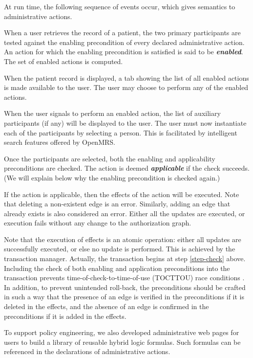 \documentclass{acm_proc_article-sp}
\newcommand{\Dfn}[1]{\textbf{\emph{#1}}}
\begin{document}
At run time, the following sequence of events occur,
which gives semantics to administrative actions.
\begin{compactenum}
\item When a user retrieves the record of a patient, the two primary
  participants are tested against the enabling precondition of every
  declared administrative action.  An action for which the enabling
  precondition is satisfied is said to be \Dfn{enabled}.
  The set of enabled actions is computed.
\item When the patient record is displayed, a tab showing
  the list of all enabled actions is made available to the user.
  The user may choose to perform any of the enabled actions.
\item When the user signals to perform an enabled action, the list of
  auxiliary participants (if any) will be displayed to the user.  The
  user must now instantiate each of the participants by selecting a person.
  This is facilitated by intelligent search features offered by
  OpenMRS.
\item \label{step-check} Once the participants are selected, both the
  enabling and applicability preconditions are checked.  The action is
  deemed \Dfn{applicable} if the check succeeds.  (We will explain
  below why the enabling precondition is checked again.)
\item If the action is applicable, then the effects of the action will
  be executed.  Note that deleting a non-existent edge is an error.
  Similarly, adding an edge that already exists is also considered an
  error.  Either all the updates are executed, or execution fails
  without any change to the authorization graph.
\end{compactenum}
Note that the execution of effects is an atomic operation: either all
updates are successfully executed, or else no update is performed.
This is achieved by the transaction manager.  Actually, the
transaction begins at step \ref{step-check} above.  Including the
check of both enabling and application preconditions into the
transaction prevents time-of-check-to-time-of-use (TOCTTOU) race
conditions \cite[\S 6.2.1]{Anderson}.  In addition, to prevent
unintended roll-back, the preconditions should be crafted in such a
way that the presence of an edge is verified in the preconditions if
it is deleted in the effects, and the absence of an edge is confirmed
in the preconditions if it is added in the effects.

To support policy engineering, we also developed administrative web
pages for users to build a library of reusable hybrid logic formulas.
Such formulas can be referenced in the declarations of administrative
actions.
\end{document}

